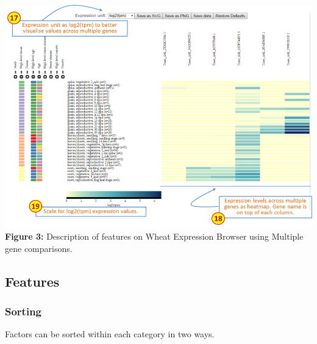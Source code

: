 \includegraphics{images/Figure2a.png} \textbf{Figure 3:} Description of
features on Wheat Expression Browser using Multiple gene comparisons.

\subsection{\textbf{Features}}\label{features}

\subsubsection{\textbf{Sorting}}\label{sorting}

Factors can be sorted within each category in two ways.

